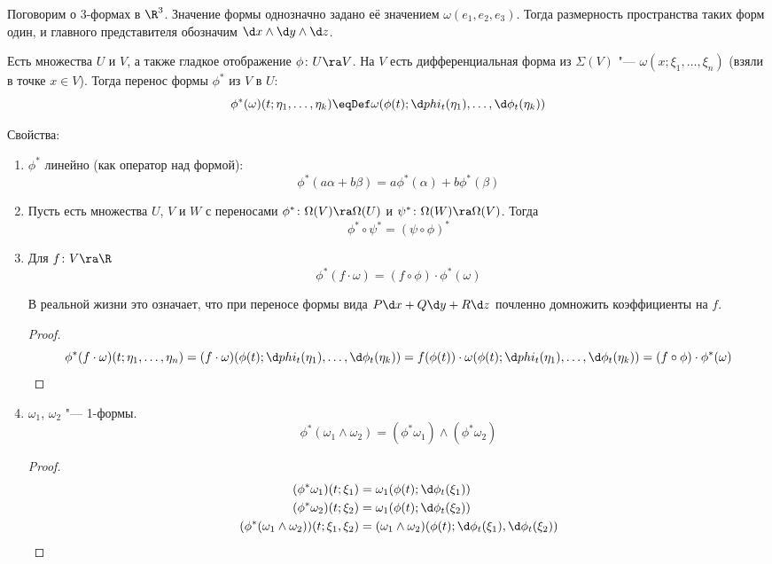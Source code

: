 Поговорим о 3-формах в $\R^3$. Значение формы однозначно задано её значением $\omega(e_1, e_2, e_3)$.
Тогда размерность пространства таких форм один, и главного представителя обозначим $\d x \wedge \d y \wedge \d z$.

\begin{Def}
	Есть множества $U$ и $V$, а также гладкое отображение $\phi\colon U \ra V$.
	На $V$ есть дифференциальная форма из $\Sigma(V)$ "--- $\omega(x; \xi_1, \dots, \xi_n)$ (взяли в точке $x \in V$).
	Тогда перенос формы $\phi^*$ из $V$ в $U$:
	\[ \phi^*(\omega)(t;\eta_1,\dots,\eta_k) \eqDef \omega(\phi(t); \d phi_t(\eta_1), \dots, \d \phi_t(\eta_k)) \]
\end{Def}

Свойства:
\begin{enumerate}
\item
	$\phi^*$ линейно (как оператор над формой):
	\[ \phi^*(a\alpha + b\beta) = a\phi^*(\alpha) + b\phi^*(\beta) \]

\item
	Пусть есть множества $U$, $V$ и $W$ с переносами $\phi^*\colon \Omega(V) \ra \Omega(U)$ и $\psi^*\colon \Omega(W) \ra \Omega(V)$.
	Тогда
	\[ \phi^* \circ \psi^* = (\psi \circ \phi)^* \]

\item
	Для $f\colon V \ra \R$
	\[ \phi^*(f \cdot \omega) = (f \circ \phi) \cdot \phi^*(\omega) \]
	\begin{Rem}
		В реальной жизни это означает, что при переносе формы вида $P \d x + Q \d y + R \d z$ почленно домножить коэффициенты на $f$.
	\end{Rem}
	\begin{proof}
		\[
			\phi^* (f \cdot \omega)(t;\eta_1, \dots, \eta_n)
			= (f \cdot \omega)(\phi(t); \d phi_t(\eta_1), \dots, \d \phi_t(\eta_k))
			= f(\phi(t)) \cdot \omega (\phi(t); \d phi_t(\eta_1), \dots, \d \phi_t(\eta_k))
			= (f \circ \phi) \cdot \phi^*(\omega)
		\]
	\end{proof}

\item
	$\omega_1$, $\omega_2$ "--- 1-формы.
	\[ \phi^*(\omega_1 \wedge \omega_2) = (\phi^* \omega_1) \wedge (\phi^* \omega_2) \]
	\begin{proof}
		\begin{align*}
			(\phi^* \omega_1) (t; \xi_1) &= \omega_1(\phi(t); \d \phi_t(\xi_1)) \\
			(\phi^* \omega_2) (t; \xi_2) &= \omega_1(\phi(t); \d \phi_t(\xi_2)) \\
			(\phi^* (\omega_1 \wedge \omega_2)) (t; \xi_1, \xi_2) &= (\omega_1 \wedge \omega_2)(\phi(t); \d \phi_t(\xi_1), \d \phi_t(\xi_2))
		\end{align*}
	\end{proof}
\end{enumerate}

